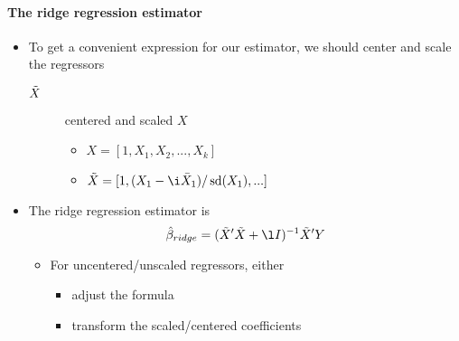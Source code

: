 \paragraph{The ridge regression estimator}
\begin{itemize}
\item To get a convenient expression for our estimator, we should center and scale the regressors
\begin{description}
\item[$\tilde{X}$] centered and scaled $X$
\begin{itemize}
\item $X = [1, X_1, X_2, ..., X_{k}]$
\item $\Xt = [1, (X_1 - \i \Xb_1) / \sd(X_1), ...]$
\end{itemize}
\end{description}
\item The ridge regression estimator is
  \[ \betah_{ridge} = (\Xt'\Xt + \l I)^{-1} \Xt'Y\]
\begin{itemize}
\item For uncentered/unscaled regressors, either
\begin{itemize}
\item adjust the formula
\item transform the scaled/centered coefficients
\end{itemize}
\end{itemize}
\end{itemize}

